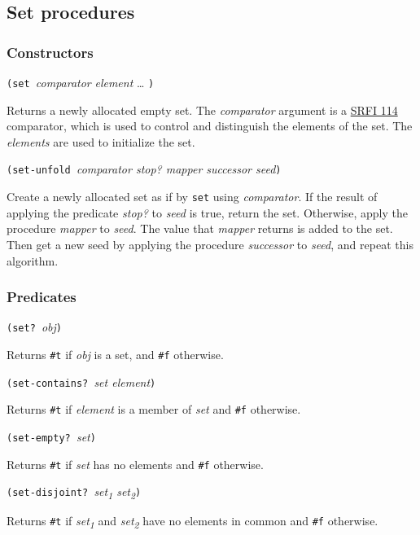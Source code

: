 \subsection{Set procedures}\label{Setprocedures}

\hypertarget{Constructors}{\subsubsection{Constructors}\label{Constructors}}

\texttt{(set\ }\emph{comparator} \emph{element} \ldots{} \texttt{)}

Returns a newly allocated empty set. The \emph{comparator} argument is a
\href{http://srfi.schemers.org/srfi-114/srfi-114.html}{SRFI 114}
comparator, which is used to control and distinguish the elements of the
set. The \emph{elements} are used to initialize the set.

\texttt{(set-unfold\ }\emph{comparator stop? mapper successor
seed}\texttt{)}

Create a newly allocated set as if by \texttt{set} using
\emph{comparator}. If the result of applying the predicate \emph{stop?}
to \emph{seed} is true, return the set. Otherwise, apply the procedure
\emph{mapper} to \emph{seed}. The value that \emph{mapper} returns is
added to the set. Then get a new seed by applying the procedure
\emph{successor} to \emph{seed}, and repeat this algorithm.

\hypertarget{Predicates}{\subsubsection{Predicates}\label{Predicates}}

\texttt{(set?\ }\emph{obj}\texttt{)}

Returns \texttt{\#t} if \emph{obj} is a set, and \texttt{\#f} otherwise.

\texttt{(set-contains?\ }\emph{set element}\texttt{)}

Returns \texttt{\#t} if \emph{element} is a member of \emph{set} and
\texttt{\#f} otherwise.

\texttt{(set-empty?\ }\emph{set}\texttt{)}

Returns \texttt{\#t} if \emph{set} has no elements and \texttt{\#f}
otherwise.

\texttt{(set-disjoint?\ }\emph{set\textsubscript{1}
set\textsubscript{2}}\texttt{)}

Returns \texttt{\#t} if \emph{set\textsubscript{1}} and
\emph{set\textsubscript{2}} have no elements in common and \texttt{\#f}
otherwise.

